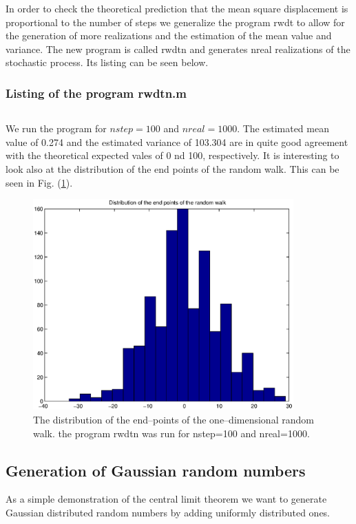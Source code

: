 In order to check the theoretical prediction that the mean square
displacement is proportional to the number of steps we generalize the program
{\sf rwdt} to allow for the generation of more realizations and 
the estimation of the mean value and variance. The new program is called 
{\sf rwdtn} and generates {\sf nreal} realizations of the 
stochastic process.
Its listing can be seen below.
\subsubsection{Listing of the program rwdtn.m}
\begin{verbatim}

\end{verbatim}
We run the program for $nstep=100$ and $nreal=1000$. The estimated
mean value of 0.274 and the estimated variance of 103.304 are in quite
good agreement with the theoretical expected vales of 0 nd 100, respectively.
It is interesting to look also at the distribution of the end points of 
the random walk. This can be seen in Fig. (\ref{F_RWDTN}).
\begin{figure}
\label{F_RWDTN}
\includegraphics[width=10cm]{./Figures/f_rwdtn.eps}
\caption{The distribution of the end--points of the one--dimensional 
random walk. the program {\sf rwdtn} was run for nstep=100 and 
nreal=1000.}
\end{figure}
\subsection{Generation of Gaussian random numbers}
As a simple demonstration of the central limit theorem we want to 
generate Gaussian distributed random numbers by adding uniformly 
distributed ones.

